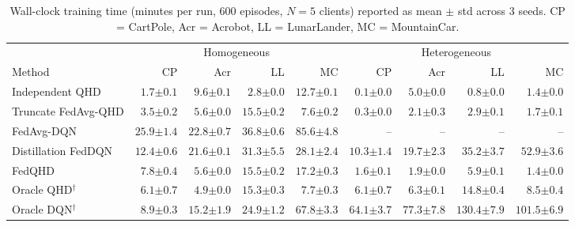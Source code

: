 \documentclass[sigconf,anonymous]{aamas}
\theoremstyle{plain}
\theoremstyle{definition}
\theoremstyle{remark}
\begin{document}
\begin{table}[t]
\centering
\caption{%
  Wall-clock training time (minutes per run, 600 episodes,  $N{=}5$ clients) reported as mean $\pm$ std across 3 seeds.
  CP = CartPole, Acr = Acrobot, LL = LunarLander, MC = MountainCar.
}
\label{tab:computation_cost}
\setlength{\tabcolsep}{5pt}
\small

\begin{tabular}{l rrrr rrrr}
\toprule
 & \multicolumn{4}{c}{Homogeneous}
 & \multicolumn{4}{c}{Heterogeneous} \\
\cmidrule(lr){2-5}\cmidrule(lr){6-9}
Method & CP & Acr & LL & MC & CP & Acr & LL & MC \\
\midrule
Independent QHD
  & $1.7{\scriptstyle\pm0.1}$  & $9.6{\scriptstyle\pm0.1}$  & $2.8{\scriptstyle\pm0.0}$  & $12.7{\scriptstyle\pm0.1}$
  & $0.1{\scriptstyle\pm0.0}$  & $5.0{\scriptstyle\pm0.0}$  & $0.8{\scriptstyle\pm0.0}$  & $1.4{\scriptstyle\pm0.0}$ \\
Truncate FedAvg-QHD
  & $3.5{\scriptstyle\pm0.2}$  & $5.6{\scriptstyle\pm0.0}$  & $15.5{\scriptstyle\pm0.2}$ & $7.6{\scriptstyle\pm0.2}$
  & $0.3{\scriptstyle\pm0.0}$  & $2.1{\scriptstyle\pm0.3}$  & $2.9{\scriptstyle\pm0.1}$  & $1.7{\scriptstyle\pm0.1}$ \\
FedAvg-DQN
  & $25.9{\scriptstyle\pm1.4}$ & $22.8{\scriptstyle\pm0.7}$ & $36.8{\scriptstyle\pm0.6}$ & $85.6{\scriptstyle\pm4.8}$
  & {--} & {--} & {--} & {--} \\
Distillation FedDQN
  & $12.4{\scriptstyle\pm0.6}$ & $21.6{\scriptstyle\pm0.1}$ & $31.3{\scriptstyle\pm5.5}$ & $28.1{\scriptstyle\pm2.4}$
  & $10.3{\scriptstyle\pm1.4}$ & $19.7{\scriptstyle\pm2.3}$ & $35.2{\scriptstyle\pm3.7}$ & $52.9{\scriptstyle\pm3.6}$ \\
FedQHD
  & $\phantom{0}7.8{\scriptstyle\pm0.4}$ & $\phantom{0}5.6{\scriptstyle\pm0.0}$ & $15.5{\scriptstyle\pm0.2}$ & $17.2{\scriptstyle\pm0.3}$
  & $1.6{\scriptstyle\pm0.1}$  & $1.9{\scriptstyle\pm0.0}$  & $5.9{\scriptstyle\pm0.1}$            & $1.4{\scriptstyle\pm0.0}$ \\
\midrule
Oracle QHD$^\dagger$
  & $\phantom{0}6.1{\scriptstyle\pm0.7}$ & $\phantom{0}4.9{\scriptstyle\pm0.0}$ & $15.3{\scriptstyle\pm0.3}$ & $\phantom{0}7.7{\scriptstyle\pm0.3}$
  & $6.1{\scriptstyle\pm0.7}$  & $6.3{\scriptstyle\pm0.1}$  & $14.8{\scriptstyle\pm0.4}$ & $8.5{\scriptstyle\pm0.4}$ \\
Oracle DQN$^\dagger$
  & $\phantom{0}8.9{\scriptstyle\pm0.3}$ & $15.2{\scriptstyle\pm1.9}$ & $24.9{\scriptstyle\pm1.2}$ & $67.8{\scriptstyle\pm3.3}$
  & $64.1{\scriptstyle\pm3.7}$ & $77.3{\scriptstyle\pm7.8}$ & $130.4{\scriptstyle\pm7.9}$ & $101.5{\scriptstyle\pm6.9}$ \\
\bottomrule
\end{tabular}
\end{table}
\end{document}
